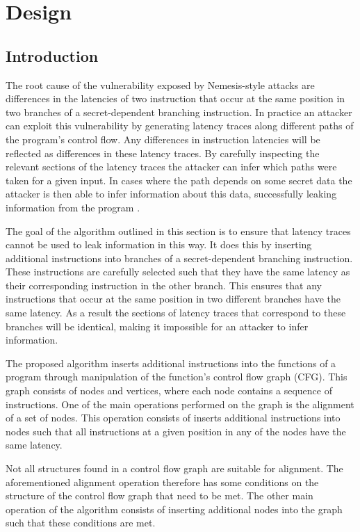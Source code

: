 \chapter{Design}
\label{cha:design}

\section{Introduction}

The root cause of the vulnerability exposed by Nemesis-style attacks are differences in the latencies of two instruction that occur at the same 
position in two branches of a secret-dependent branching instruction. 
In practice an attacker can exploit this vulnerability by generating latency traces along different paths of the program's control flow. 
Any differences in instruction latencies will be reflected as differences in these latency traces. 
By carefully inspecting the relevant sections of the latency traces the attacker can infer which paths were taken for a given input. 
In cases where the path depends on some secret data the attacker is then able to infer information about this data, successfully leaking information from the program \cite{Nemesis}.

The goal of the algorithm outlined in this section is to ensure that latency traces cannot be used to leak information in this way.
It does this by inserting additional instructions into branches of a secret-dependent branching instruction. These instructions 
are carefully selected such that they have the same latency as their corresponding instruction in the other branch. This ensures that
any instructions that occur at the same position in two different branches have the same latency. As a result the sections of latency traces
that correspond to these branches will be identical, making it impossible for an attacker to infer information. 


The proposed algorithm inserts additional instructions into the functions of a program through manipulation of the function's control flow graph (CFG). 
This graph consists of nodes and vertices, where each node contains a sequence of instructions. 
One of the main operations performed on the graph is the alignment of a set of nodes. 
This operation consists of inserts additional instructions into nodes such that all instructions at a given position in any of the nodes have the same latency. 

Not all structures found in a control flow graph are suitable for alignment. The aforementioned alignment operation therefore has some conditions on the structure of the control flow graph that need to be met. 
The other main operation of the algorithm consists of inserting additional nodes into the graph such that these conditions are met. 

